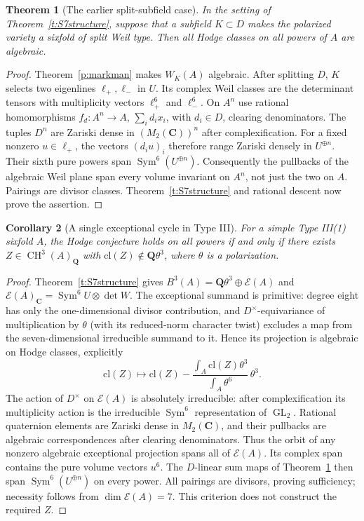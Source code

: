 \documentclass[10pt,reqno]{article}
\theoremstyle{emphasizedplain}
\newtheorem{theorem}{Theorem}[section]
\newtheorem{corollary}[theorem]{Corollary}
\theoremstyle{emphasizeddefinition}
\theoremstyle{emphasizeddefinition}
\DeclareMathOperator{\GL}{GL}
\DeclareMathOperator{\Sym}{Sym}
\DeclareMathOperator{\CH}{CH}
\newcommand{\Q}{\mathbf Q}
\newcommand{\C}{\mathbf C}
\newcommand{\B}{B}
\begin{document}
\begin{theorem}[The earlier split-subfield case]\label{t:S7split}
In the setting of Theorem~\ref{t:S7structure}, suppose that a subfield
$K\subset D$ makes the polarized variety a sixfold of split Weil type.
Then all Hodge classes on all powers of $A$ are algebraic.
\end{theorem}
\begin{proof}
Theorem~\ref{p:markman} makes $W_K(A)$ algebraic. After splitting $D$,
$K$ selects two eigenlines $\ell_+,\ell_-$ in $U$. Its complex Weil
classes are the determinant tensors with multiplicity vectors
$\ell_+^6$ and $\ell_-^6$.
On $A^n$ use rational homomorphisms
$f_d:A^n\to A$, $\sum_i d_i x_i$, with $d_i\in D$, clearing denominators.
The tuples $D^n$ are Zariski dense in $(M_2(\C))^n$ after complexification.
For a fixed nonzero $u\in\ell_+$, the vectors $(d_i u)_i$ therefore range
Zariski densely in $U^{\oplus n}$. Their sixth pure powers span
$\Sym^6(U^{\oplus n})$.
Consequently the pullbacks of the algebraic Weil plane span every volume
invariant on $A^n$, not just the two on $A$. Pairings are divisor classes.
Theorem~\ref{t:S7structure} and rational descent now prove the assertion.
\end{proof}
\begin{corollary}[A single exceptional cycle in Type III]
\label{p:S7onecycle}
For a simple Type III(1) sixfold $A$, the Hodge conjecture holds on
all powers if and only if there exists $Z\in\CH^3(A)_\Q$ with
$\mathrm{cl}(Z)\notin\Q\theta^3$, where $\theta$ is a polarization.
\end{corollary}
\begin{proof}
Theorem~\ref{t:S7structure} gives
$\B^3(A)=\Q\theta^3\oplus\mathcal E(A)$ and
$\mathcal E(A)_\C=\Sym^6 U\otimes\det W$.
The exceptional summand is primitive: degree eight has only the
one-dimensional divisor contribution, and $D^\times$-equivariance
of multiplication by $\theta$ (with its reduced-norm character twist)
excludes a map from the seven-dimensional irreducible summand to it. Hence its projection is
algebraic on Hodge classes, explicitly
\[
 \mathrm{cl}(Z)\longmapsto\mathrm{cl}(Z)
 -\frac{\int_A\mathrm{cl}(Z)\theta^3}{\int_A\theta^6}\,\theta^3.
\]
The action of $D^\times$ on $\mathcal E(A)$ is absolutely irreducible:
after complexification its multiplicity action is the irreducible
$\Sym^6$ representation of $\GL_2$. Rational quaternion elements
are Zariski dense in $M_2(\C)$, and their pullbacks are algebraic
correspondences after clearing denominators. Thus the orbit of any
nonzero algebraic exceptional projection spans all of $\mathcal E(A)$.
Its complex span contains the pure volume vectors $u^6$.
The $D$-linear sum maps of Theorem~\ref{t:S7split} then span
$\Sym^6(U^{\oplus n})$ on every power. All pairings are divisors,
proving sufficiency; necessity follows from $\dim\mathcal E(A)=7$.
This criterion does not construct the required $Z$.
\end{proof}
\end{document}
